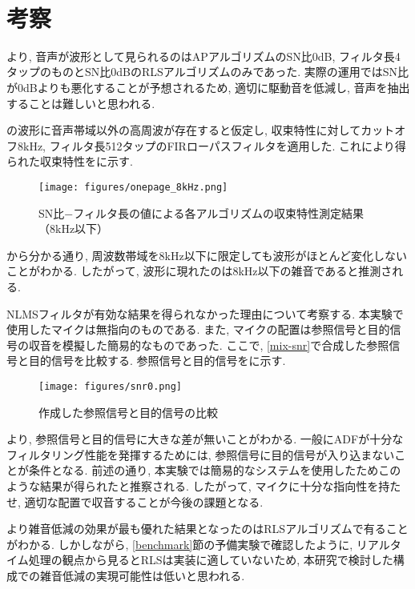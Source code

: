 \
\section{考察}\label{consideration-practice}

より, 音声が波形として見られるのはAPアルゴリズムのSN比0dB, フィルタ長4タップのものとSN比0dBのRLSアルゴリズムのみであった. 実際の運用ではSN比が0dBよりも悪化することが予想されるため, 適切に駆動音を低減し, 音声を抽出することは難しいと思われる. 

の波形に音声帯域以外の高周波が存在すると仮定し, 収束特性に対してカットオフ8kHz, フィルタ長512タップのFIRローパスフィルタを適用した. これにより得られた収束特性をに示す. 

\begin{figure}[H]
\centering
\texttt{[image: figures/onepage\_8kHz.png]}
\label{fig:onepage_8kHz}
\caption{SN比−フィルタ長の値による各アルゴリズムの収束特性測定結果（8kHz以下）}
\end{figure}

から分かる通り, 周波数帯域を8kHz以下に限定しても波形がほとんど変化しないことがわかる. したがって, 波形に現れたのは8kHz以下の雑音であると推測される. 

NLMSフィルタが有効な結果を得られなかった理由について考察する. 本実験で使用したマイクは無指向のものである. また, マイクの配置は参照信号と目的信号の収音を模擬した簡易的なものであった. ここで, \ref{mix-snr}で合成した参照信号と目的信号を比較する. 参照信号と目的信号をに示す. 

\begin{figure}[H]
\centering
\texttt{[image: figures/snr0.png]}
\caption{作成した参照信号と目的信号の比較}
\label{fig:compare_x_d}
\end{figure}

より, 参照信号と目的信号に大きな差が無いことがわかる. 一般にADFが十分なフィルタリング性能を発揮するためには, 参照信号に目的信号が入り込まないことが条件となる. 前述の通り, 本実験では簡易的なシステムを使用したためこのような結果が得られたと推察される. したがって, マイクに十分な指向性を持たせ, 適切な配置で収音することが今後の課題となる. 

より雑音低減の効果が最も優れた結果となったのはRLSアルゴリズムで有ることがわかる. しかしながら, \ref{benchmark}節の予備実験で確認したように, リアルタイム処理の観点から見るとRLSは実装に適していないため, 本研究で検討した構成での雑音低減の実現可能性は低いと思われる. 
